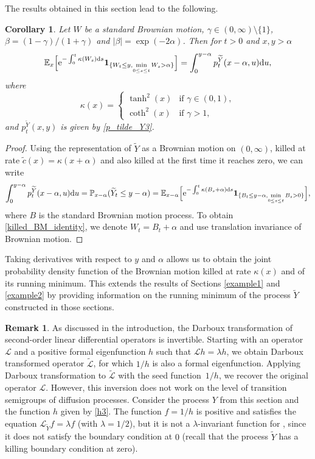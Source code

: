 \documentclass[10pt,a4paper]{amsart}
\numberwithin{equation}{section}
\newtheorem{Corollary}[Theorem]{Corollary}
\theoremstyle{definition}
\newtheorem{Remark}[Theorem]{Remark}
\def\L{{\mathcal L}}
\def\p{{\mathbb P}}
\def\e{{\mathbb E}}
\def\d{{\textnormal d}}
\begin{document}
The results obtained in this section lead to the following.

\begin{Corollary}
 Let $W$ be a standard Brownian motion, $\gamma \in (0,\infty) \setminus \{1\}$, $\beta=(1-\gamma)/(1+\gamma)$ and $|\beta|=\exp(-2 \alpha)$. Then for $t>0$ and $x,y>\alpha$
 \begin{equation}\label{killed_BM_identity}
 \e_x\Big[ {\rm e}^{-\int_0^t \kappa(W_s) \d s} {\mathbf 1}_{\{ W_t \le y, \min\limits_{0\le s \le t} W_s>\alpha\}}\Big]=\int_0^{y-\alpha} p_t^{\widetilde Y}(x-\alpha,u)\d u,
 \end{equation}
 where
 \[
\kappa(x)=
\begin{cases}
\tanh^2(x)  &\text{if }  \gamma \in (0,1),\\
\coth^2(x)  &\text{if }  \gamma>1,
\end{cases}
\]
and $p_t^{\widetilde Y}(x,y)$ is given by \eqref{p_tilde_Y3}.
\end{Corollary}
\begin{proof}
Using the representation of $\widetilde Y$ as a Brownian motion on $(0,\infty)$, killed at rate $\tilde c(x)=\kappa(x+\alpha)$ and also killed at the first time it reaches zero, we can write
\[
\int_0^{y-\alpha} p_t^{\widetilde Y}(x-\alpha,u)\d u=\p_{x-\alpha}(\widetilde Y_t \le y-\alpha)=\e_{x-\alpha}\Big[ {\rm e}^{-\int_0^t \kappa(B_s+\alpha) \d s} {\mathbf 1}_{\{ B_t \le y-\alpha, \min\limits_{0\le s \le t} B_s>0\}}\Big],
\]
where $B$ is the standard Brownian motion process. To obtain \eqref{killed_BM_identity}, we denote $W_t=B_t+\alpha$ and use translation invariance of Brownian motion.
\end{proof}

Taking derivatives with respect to $y$ and $\alpha$ allows us to obtain the joint probability density function of the Brownian motion killed at rate $\kappa(x)$ and of its running minimum. This extends the results of Sections \ref{example1} and \ref{example2} by providing information on the running minimum of the process $\widetilde Y$ constructed in those sections.

\begin{Remark}
As discussed in the introduction, the Darboux transformation of second-order linear differential operators is invertible. Starting with an operator $\L$ and a positive formal eigenfunction $h$ such that $\L h= \lambda h$, we obtain Darboux transformed operator $\widetilde \L$, for which $1/h$ is also a formal eigenfunction. Applying Darboux transformation to $\tilde \L$ with the seed function~$1/h$, we recover the original operator $\L$. However, this inversion does not work on the level of transition semigroups of diffusion processes. Consider the process $Y$ from this section and the function $h$ given by \eqref{h3}. The function $f=1/h$ is positive and satisfies the equation $\L_{\widetilde Y} f=\lambda f $ (with $\lambda=1/2$), but it is not a $\lambda$-invariant function for , since it does not satisfy the boundary condition at $0$ (recall that the process $\widetilde Y$ has a killing boundary condition at zero).
\end{Remark}
\end{document}
